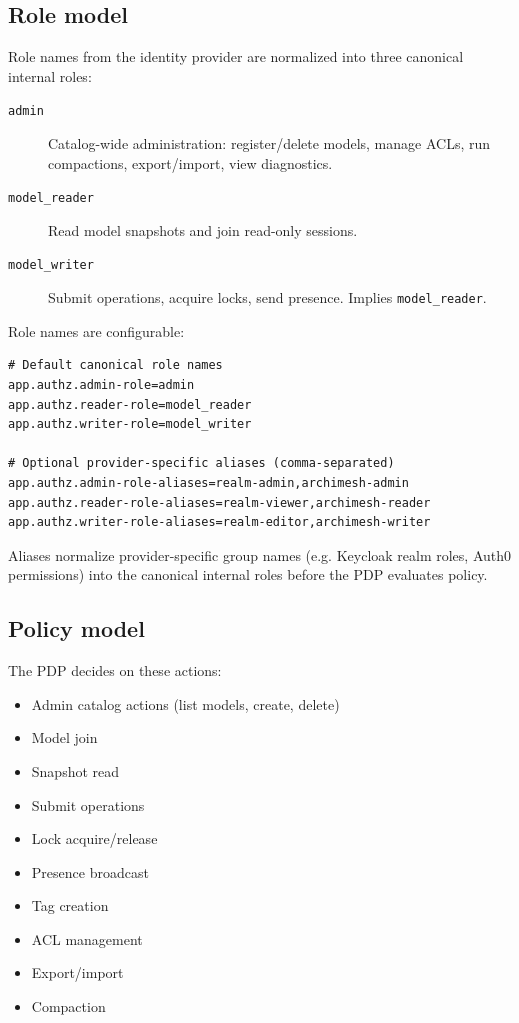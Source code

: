 \subsection{Role model}

Role names from the identity provider are normalized into three canonical
internal roles:

\begin{description}
\item[\texttt{admin}] Catalog-wide administration: register/delete models,
  manage ACLs, run compactions, export/import, view diagnostics.
\item[\texttt{model\_reader}] Read model snapshots and join read-only
  sessions.
\item[\texttt{model\_writer}] Submit operations, acquire locks, send
  presence. Implies \texttt{model\_reader}.
\end{description}

Role names are configurable:

\begin{lstlisting}[caption={Role configuration}]
# Default canonical role names
app.authz.admin-role=admin
app.authz.reader-role=model_reader
app.authz.writer-role=model_writer

# Optional provider-specific aliases (comma-separated)
app.authz.admin-role-aliases=realm-admin,archimesh-admin
app.authz.reader-role-aliases=realm-viewer,archimesh-reader
app.authz.writer-role-aliases=realm-editor,archimesh-writer
\end{lstlisting}

Aliases normalize provider-specific group names (e.g. Keycloak realm roles,
Auth0 permissions) into the canonical internal roles before the PDP evaluates
policy.

\subsection{Policy model}

The PDP decides on these actions:

\begin{itemize}
\item Admin catalog actions (list models, create, delete)
\item Model join
\item Snapshot read
\item Submit operations
\item Lock acquire/release
\item Presence broadcast
\item Tag creation
\item ACL management
\item Export/import
\item Compaction
\end{itemize}

